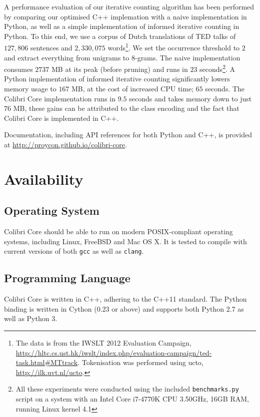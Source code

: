 \documentclass[a4paper,12pt]{article}
\begin{document}
A performance evaluation of our iterative counting algorithm has been performed
by comparing our optimised C++ implemation with a naive implementation in
Python, as well as a simple implementation of informed iterative counting in
Python. To this end, we use a corpus of Dutch translations of TED talks of
$127,806$ sentences and $2,330,075$ words\footnote{The data is from the IWSLT
2012 Evaluation Campaign, \url{http://hltc.cs.ust.hk/iwslt/index.php/evaluation-campaign/ted-task.html\#MTtrack}.
Tokenisation was performed using ucto, \url{http://ilk.uvt.nl/ucto}.}. We set
the occurrence threshold to $2$ and extract everything from unigrams to
$8$-grams. The naive implementation consumes $2737$ MB at its peak (before
pruning) and runs in $23$ seconds\footnote{All these experiments were conducted using the
    included \texttt{benchmarks.py} script on a system
    with an Intel Core i7-4770K CPU \@ 3.50GHz, 16GB RAM, running Linux kernel
4.1}. A Python implementation of informed iterative counting significantly
lowers memory usage to $167$ MB, at the cost of increased CPU time; $65$
seconds. The Colibri Core implementation runs in $9.5$ seconds and takes memory
down to just $76$ MB, these gains can be attributed to the class encoding and
the fact that Colibri Core is implemented in C++.

Documentation, including API references for both Python and C++, is provided at
\url{http://proycon.github.io/colibri-core}. 

\section{Availability}

\subsection{Operating System}

Colibri Core should be able to run on modern POSIX-compliant operating systems, including
Linux, FreeBSD and Mac OS X. It is tested to compile with current versions of
both \texttt{gcc} as well as \texttt{clang}.

\subsection{Programming Language}

Colibri Core is written in C++, adhering to the C++11 standard. The Python
binding is written in Cython (0.23 or above) and supports both Python 2.7 as
well as Python 3.
\end{document}
